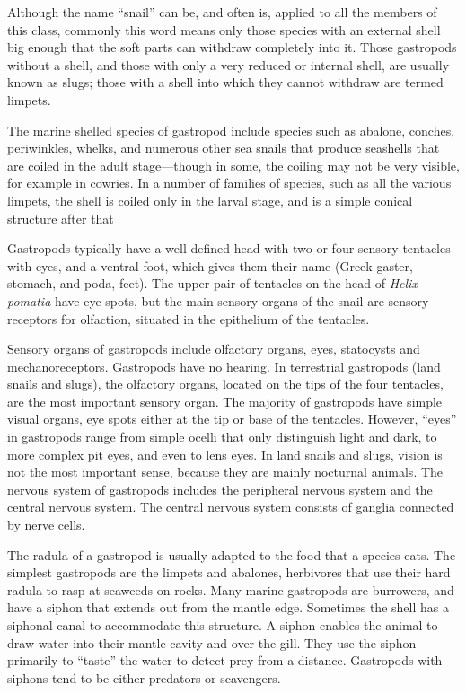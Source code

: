 \documentclass[]{book}
\theoremstyle{definition}
\theoremstyle{definition}
\theoremstyle{definition}
\theoremstyle{remark}
\begin{document}
Although the name ``snail'' can be, and often is, applied to all the
members of this class, commonly this word means only those species with
an external shell big enough that the soft parts can withdraw completely
into it. Those gastropods without a shell, and those with only a very
reduced or internal shell, are usually known as slugs; those with a
shell into which they cannot withdraw are termed limpets.

The marine shelled species of gastropod include species such as abalone,
conches, periwinkles, whelks, and numerous other sea snails that produce
seashells that are coiled in the adult stage---though in some, the
coiling may not be very visible, for example in cowries. In a number of
families of species, such as all the various limpets, the shell is
coiled only in the larval stage, and is a simple conical structure after
that

Gastropods typically have a well-defined head with two or four sensory
tentacles with eyes, and a ventral foot, which gives them their name
(Greek gaster, stomach, and poda, feet). The upper pair of tentacles on
the head of \emph{Helix pomatia} have eye spots, but the main sensory organs of
the snail are sensory receptors for olfaction, situated in the
epithelium of the tentacles.

Sensory organs of gastropods include olfactory organs, eyes, statocysts
and mechanoreceptors. Gastropods have no hearing. In terrestrial
gastropods (land snails and slugs), the olfactory organs, located on the
tips of the four tentacles, are the most important sensory organ. The
majority of gastropods have simple visual organs, eye spots either at
the tip or base of the tentacles. However, ``eyes'' in gastropods range
from simple ocelli that only distinguish light and dark, to more complex
pit eyes, and even to lens eyes. In land snails and slugs, vision is not
the most important sense, because they are mainly nocturnal animals. The
nervous system of gastropods includes the peripheral nervous system and
the central nervous system. The central nervous system consists of
ganglia connected by nerve cells.

The radula of a gastropod is usually adapted to the food that a species
eats. The simplest gastropods are the limpets and abalones, herbivores
that use their hard radula to rasp at seaweeds on rocks. Many marine
gastropods are burrowers, and have a siphon that extends out from the
mantle edge. Sometimes the shell has a siphonal canal to accommodate
this structure. A siphon enables the animal to draw water into their
mantle cavity and over the gill. They use the siphon primarily to
``taste'' the water to detect prey from a distance. Gastropods with
siphons tend to be either predators or scavengers.
\end{document}
